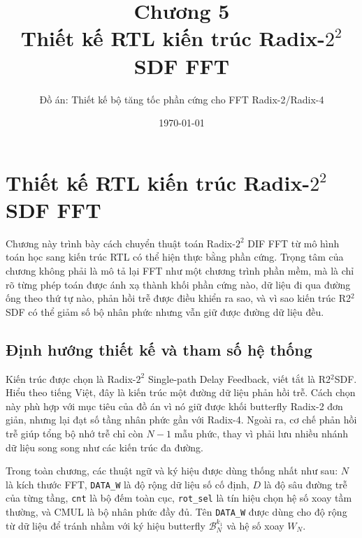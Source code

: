 \documentclass[12pt,a4paper]{report}
\title{\textbf{Chương 5\\Thiết kế RTL kiến trúc Radix-$2^2$ SDF FFT}}
\author{Đồ án: Thiết kế bộ tăng tốc phần cứng cho FFT Radix-2/Radix-4}
\date{\today}
\numberwithin{equation}{chapter}
\begin{document}
\maketitle
\tableofcontents
\clearpage
\setcounter{chapter}{4}

\chapter[Thiết kế RTL kiến trúc Radix-2 bình phương SDF FFT]{Thiết kế RTL kiến trúc Radix-$2^2$ SDF FFT}
\label{chap:rtl_r22sdf}

Chương này trình bày cách chuyển thuật toán Radix-$2^2$ DIF FFT từ mô hình toán học sang kiến trúc RTL có thể hiện thực bằng phần cứng. Trọng tâm của chương không phải là mô tả lại FFT như một chương trình phần mềm, mà là chỉ rõ từng phép toán được ánh xạ thành khối phần cứng nào, dữ liệu đi qua đường ống theo thứ tự nào, phản hồi trễ được điều khiển ra sao, và vì sao kiến trúc R2$^2$SDF có thể giảm số bộ nhân phức nhưng vẫn giữ được đường dữ liệu đều.

\section{Định hướng thiết kế và tham số hệ thống}
\label{sec:r22rtl_design_goal}

Kiến trúc được chọn là Radix-$2^2$ Single-path Delay Feedback, viết tắt là R2$^2$SDF. Hiểu theo tiếng Việt, đây là kiến trúc một đường dữ liệu phản hồi trễ. Cách chọn này phù hợp với mục tiêu của đồ án vì nó giữ được khối butterfly Radix-2 đơn giản, nhưng lại đạt số tầng nhân phức gần với Radix-4. Ngoài ra, cơ chế phản hồi trễ giúp tổng bộ nhớ trễ chỉ còn $N-1$ mẫu phức, thay vì phải lưu nhiều nhánh dữ liệu song song như các kiến trúc đa đường.

Trong toàn chương, các thuật ngữ và ký hiệu được dùng thống nhất như sau: $N$ là kích thước FFT, \texttt{DATA\_W} là độ rộng dữ liệu số cố định, $D$ là độ sâu đường trễ của từng tầng, \texttt{cnt} là bộ đếm toàn cục, \texttt{rot\_sel} là tín hiệu chọn hệ số xoay tầm thường, và CMUL là bộ nhân phức đầy đủ. Tên \texttt{DATA\_W} được dùng cho độ rộng từ dữ liệu để tránh nhầm với ký hiệu butterfly $\mathcal{B}_N^{k_1}$ và hệ số xoay $W_N$.
\end{document}
